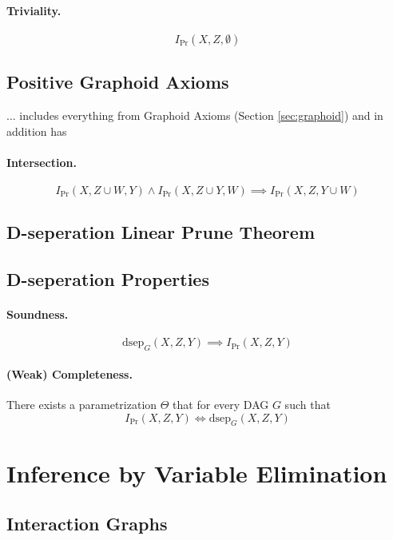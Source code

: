 \documentclass[11pt]{article}
\newcommand{\pr}{\mathrm{Pr}}
\newcommand{\dsep}{\mathrm{dsep}}
\begin{document}
\paragraph{Triviality.}
\begin{equation}
	I_\pr (X, Z, \emptyset) 
\end{equation}

\subsection{Positive Graphoid Axioms}
... includes everything from Graphoid Axioms (Section \ref{sec:graphoid}) and in addition has 
\paragraph{Intersection.}
\begin{equation}
	I _ \pr (X, Z \cup W, Y ) \land I _\pr (X, Z \cup Y , W ) \implies I _\pr (X, Z, Y \cup W)
\end{equation}

\subsection{D-seperation Linear Prune Theorem}

\subsection{D-seperation Properties}
\paragraph{Soundness.} 
\begin{equation}
	\dsep_ G ( X, Z, Y ) \implies I _\pr (X, Z, Y)
\end{equation}

\paragraph{(Weak) Completeness.}
There exists a parametrization $\Theta$ that for every DAG $G$ such that
\begin{equation}
	I_\pr (X, Z, Y) \iff \dsep_G (X, Z, Y)
\end{equation}

\section{Inference by Variable Elimination}
\subsection{Interaction Graphs} 
\end{document}
